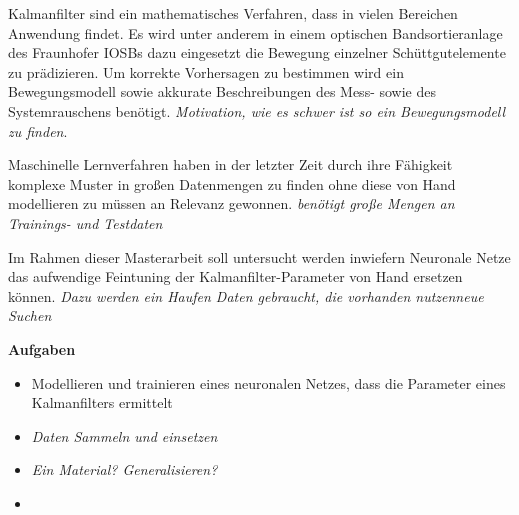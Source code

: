 \documentclass [a4paper, 10pt]{scrartcl}
\begin{document}
\Anfang
Kalmanfilter sind ein mathematisches Verfahren, dass in vielen Bereichen Anwendung findet. 
Es wird unter anderem in einem optischen Bandsortieranlage des Fraunhofer IOSBs dazu eingesetzt die Bewegung einzelner Schüttgutelemente zu prädizieren.
Um korrekte Vorhersagen zu bestimmen wird ein Bewegungsmodell sowie akkurate Beschreibungen des Mess- sowie des Systemrauschens benötigt.
\textit{Motivation, wie es schwer ist so ein Bewegungsmodell zu finden}.


Maschinelle Lernverfahren haben in der letzter Zeit durch ihre Fähigkeit 
komplexe Muster in großen Datenmengen zu finden ohne diese von Hand modellieren zu müssen an Relevanz gewonnen.
\textit{benötigt große Mengen an Trainings- und Testdaten}

Im Rahmen dieser Masterarbeit soll untersucht werden inwiefern Neuronale Netze das aufwendige Feintuning der  Kalmanfilter-Parameter von Hand ersetzen können.
\textit{Dazu werden ein Haufen Daten gebraucht, die vorhanden nutzen\/neue Suchen}




\textbf{Aufgaben}
\begin{itemize}
  \item Modellieren und trainieren eines neuronalen Netzes, dass die Parameter eines Kalmanfilters ermittelt
  \item \textit{Daten Sammeln und einsetzen}
  \item \textit{Ein Material? Generalisieren?}
  \item 
\end{itemize}
\Ende
\end{document}
